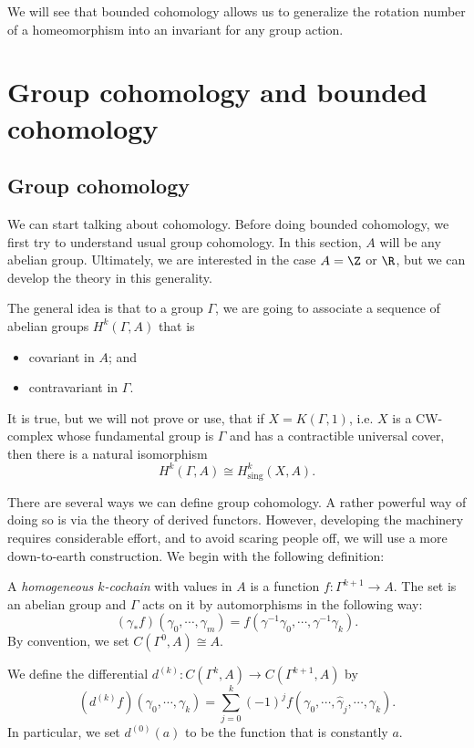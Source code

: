\documentclass[a4paper]{article}
\begin{document}
We will see that bounded cohomology allows us to generalize the rotation number of a homeomorphism into an invariant for any group action.

\section{Group cohomology and bounded cohomology}
\subsection{Group cohomology}
We can start talking about cohomology. Before doing bounded cohomology, we first try to understand usual group cohomology. In this section, $A$ will be any abelian group. Ultimately, we are interested in the case $A = \Z$ or $\R$, but we can develop the theory in this generality.

The general idea is that to a group $\Gamma$, we are going to associate a sequence of abelian groups $H^k(\Gamma, A)$ that is
\begin{itemize}
  \item covariant in $A$; and
  \item contravariant in $\Gamma$.
\end{itemize}
It is true, but we will not prove or use, that if $X = K(\Gamma, 1)$, i.e. $X$ is a CW-complex whose fundamental group is $\Gamma$ and has a contractible universal cover, then there is a natural isomorphism
\[
  H^k(\Gamma, A) \cong H^k_{\mathrm{sing}}(X, A).
\]

There are several ways we can define group cohomology. A rather powerful way of doing so is via the theory of derived functors. However, developing the machinery requires considerable effort, and to avoid scaring people off, we will use a more down-to-earth construction. We begin with the following definition:

\begin{defi}
  A \emph{homogeneous $k$-cochain} with values in $A$ is a function $f\colon \Gamma^{k + 1} \to A$. The set  is an abelian group and $\Gamma$ acts on it by automorphisms in the following way:
  \[
    (\gamma_* f) (\gamma_0, \cdots, \gamma_m) = f(\gamma^{-1} \gamma_0, \cdots, \gamma^{-1} \gamma_k).
  \]
  By convention, we set $C(\Gamma^0, A) \cong A$.
\end{defi}

\begin{defi}[Differential $d^{(k)}$]
  We define the differential $d^{(k)}\colon C(\Gamma^k, A) \to C(\Gamma^{k + 1}, A)$ by
  \[
    (d^{(k)}f) (\gamma_0, \cdots, \gamma_k) = \sum_{j = 0}^k (-1)^j f(\gamma_0, \cdots, \hat{\gamma}_j, \cdots, \gamma_k).
  \]
  In particular, we set $d^{(0)}(a)$ to be the function that is constantly $a$.
\end{defi}
\end{document}
